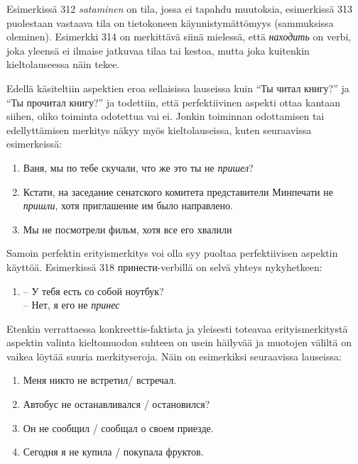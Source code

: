 \documentclass[]{scrreprt}
\providecommand{\tightlist}{%
  \setlength{\itemsep}{0pt}\setlength{\parskip}{0pt}}
\begin{document}
Esimerkissä 312 \emph{sataminen} on tila, jossa ei tapahdu muutoksia,
esimerkissä 313 puolestaan vastaava tila on tietokoneen
käynnistymättömyys (sammuksissa oleminen). Esimerkki 314 on merkittävä
siinä mielessä, että \emph{находить} on verbi, joka yleensä ei ilmaise
jatkuvaa tilaa tai kestoa, mutta joka kuitenkin kieltolauseessa näin
tekee.

Edellä käsiteltiin aspektien eroa sellaisissa lauseissa kuin ``Ты читал
книгу?'' ja ``Ты прочитал книгу?'' ja todettiin, että perfektiivinen
aspekti ottaa kantaan siihen, oliko toiminta odotettua vai ei. Jonkin
toiminnan odottamisen tai edellyttämisen merkitys näkyy myös
kieltolauseissa, kuten seuraavissa esimerkeissä:

\begin{enumerate}
\def\labelenumi{(\arabic{enumi})}
\setcounter{enumi}{314}
\tightlist
\item
  Ваня, мы по тебе скучали, что же это ты не \emph{пришел}?
\item
  Кстати, на заседание сенатского комитета представители Минпечати не
  \emph{пришли}, хотя приглашение им было направлено.
\item
  Мы не посмотрели фильм, хотя все его хвалили
\end{enumerate}

Samoin perfektin erityismerkitys voi olla syy puoltaa perfektiivisen
aspektin käyttöä. Esimerkissä 318 принести-verbillä on selvä yhteys
nykyhetkeen:

\begin{enumerate}
\def\labelenumi{(\arabic{enumi})}
\setcounter{enumi}{317}
\tightlist
\item
  -- У тебя есть со собой ноутбук?\\
   -- Нет, я его не \emph{принес}
\end{enumerate}

Etenkin verrattaessa konkreettis-faktista ja yleisesti toteavaa
erityismerkitystä aspektin valinta kieltomuodon suhteen on usein
häilyvää ja muotojen väliltä on vaikea löytää suuria merkityseroja. Näin
on esimerkiksi seuraavissa lauseissa:

\begin{enumerate}
\def\labelenumi{(\arabic{enumi})}
\setcounter{enumi}{318}
\tightlist
\item
  Меня никто не встретил/ встречал.
\item
  Автобус не останавливался / остановился?
\item
  Он не сообщил / сообщал о своем приезде.
\item
  Сегодня я не купила / покупала фруктов.
\end{enumerate}
\end{document}
